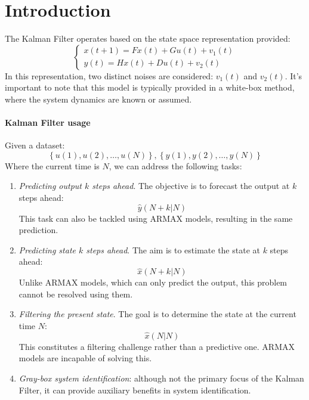 \section{Introduction}

The Kalman Filter operates based on the state space representation provided:
\[\begin{cases}
    x(t+1)=Fx(t)+Gu(t)+v_1(t) \\
    y(t)=Hx(t)+Du(t)+v_2(t)
\end{cases}\]
In this representation, two distinct noises are considered: $v_1(t)$ and $v_2(t)$. 
It's important to note that this model is typically provided in a white-box method, where the system dynamics are known or assumed.

\paragraph*{Kalman Filter usage}
Given a dataset:
\[\left\{ u(1),u(2),\dots,u(N)\right\},\left\{ y(1),y(2),\dots,y(N)\right\}\]
Where the current time is $N$, we can address the following tasks:
\begin{enumerate}
    \item \textit{Predicting output $k$ steps ahead}. 
        The objective is to forecast the output at $k$ steps ahead:
        \[\hat{y}(N+k|N)\]
        This task can also be tackled using ARMAX models, resulting in the same prediction.
    \item \textit{Predicting state $k$ steps ahead}.
        The aim is to estimate the state at $k$ steps ahead:
        \[\hat{x}(N+k|N)\]
        Unlike ARMAX models, which can only predict the output, this problem cannot be resolved using them.
    \item \textit{Filtering the present state}. 
        The goal is to determine the state at the current time $N$:
        \[\hat{x}(N|N)\]
        This constitutes a filtering challenge rather than a predictive one. 
        ARMAX models are incapable of solving this.
    \item \textit{Gray-box system identification}: although not the primary focus of the Kalman Filter, it can provide auxiliary benefits in system identification.
\end{enumerate}

